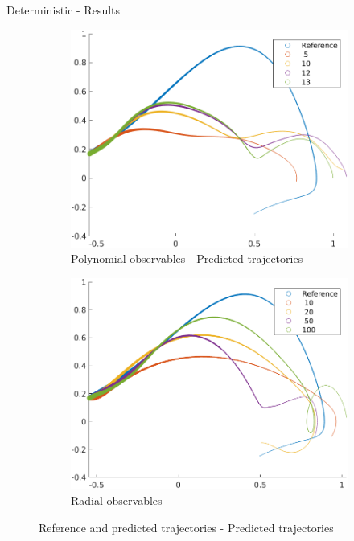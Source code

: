\documentclass{beamer}
\begin{document}
\begin{frame}{Deterministic - Results}
    \begin{figure}
        \centering
        \begin{subfigure}[b]{0.45\textwidth}
            \centering
            \includegraphics[width=\textwidth]{Verification_Poly.png}
            \caption{Polynomial observables - Predicted trajectories}
            \label{fig:verification_poly}
        \end{subfigure}
        \hfill
        \begin{subfigure}[b]{0.45\textwidth}
            \centering
            \includegraphics[width=\textwidth]{Verification_Radial.png}
            \caption{Radial observables}
            \label{fig:verification_radial}
        \end{subfigure}
        \caption{Reference and predicted trajectories - Predicted trajectories}
    \end{figure}
\end{frame}
\end{document}
